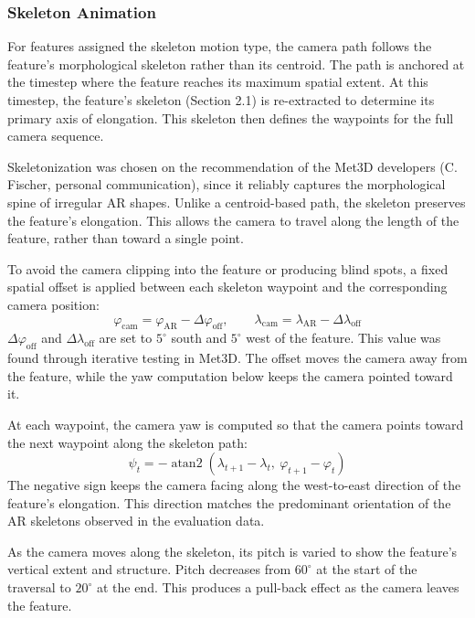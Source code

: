 \documentclass[journal abbreviation, manuscript]{copernicus}
\begin{document}
\subsubsection{Skeleton Animation}

For features assigned the skeleton motion type, the camera path follows
the feature's morphological skeleton rather than its centroid. The path
is anchored at the timestep where the feature reaches its maximum
spatial extent. At this timestep, the feature's skeleton (Section 2.1)
is re-extracted to determine its primary axis of elongation. This
skeleton then defines the waypoints for the full camera sequence.

Skeletonization was chosen on the recommendation of the Met3D developers
(C. Fischer, personal communication), since it reliably captures the
morphological spine of irregular AR shapes. Unlike a centroid-based
path, the skeleton preserves the feature's elongation. This allows the
camera to travel along the length of the feature, rather than toward a
single point.

To avoid the camera clipping into the feature or producing blind spots,
a fixed spatial offset is applied between each skeleton waypoint and
the corresponding camera position:
\begin{equation}
\varphi_{\mathrm{cam}} = \varphi_{\mathrm{AR}} - \Delta\varphi_{\mathrm{off}},
\qquad
\lambda_{\mathrm{cam}} = \lambda_{\mathrm{AR}} - \Delta\lambda_{\mathrm{off}}
\tag{10}
\end{equation}
$\Delta\varphi_{\mathrm{off}}$ and $\Delta\lambda_{\mathrm{off}}$ are set
to $5^{\circ}$ south and $5^{\circ}$ west of the feature. This value was
found through iterative testing in Met3D. The offset moves the camera
away from the feature, while the yaw computation below keeps the camera
pointed toward it.

At each waypoint, the camera yaw is computed so that the camera points
toward the next waypoint along the skeleton path:
\begin{equation}
\psi_t = -\operatorname{atan2}\!\left(\lambda_{t+1}-\lambda_t,\ \varphi_{t+1}-\varphi_t\right)
\tag{11}
\end{equation}
The negative sign keeps the camera facing along the west-to-east
direction of the feature's elongation. This direction matches the
predominant orientation of the AR skeletons observed in the evaluation
data.

As the camera moves along the skeleton, its pitch is varied to show the
feature's vertical extent and structure. Pitch decreases from
$60^{\circ}$ at the start of the traversal to $20^{\circ}$ at the end.
This produces a pull-back effect as the camera leaves the feature.
\end{document}
